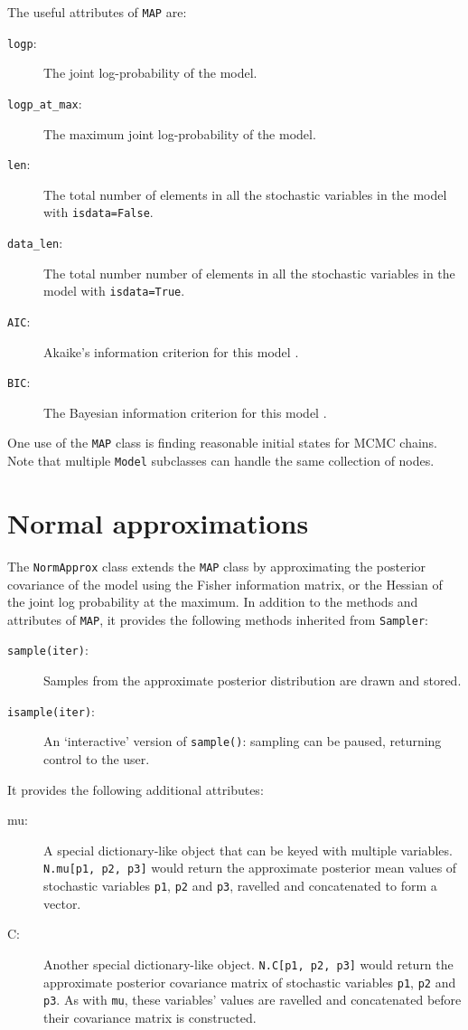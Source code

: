 The useful attributes of \texttt{MAP} are:
\begin{description}
    \item[\texttt{logp}:] The joint log-probability of the model.
    \item[\texttt{logp_at_max}:] The maximum joint log-probability of the model.
    \item[\texttt{len}:] The total number of elements in all the stochastic variables in the model with \texttt{isdata=False}.
    \item[\texttt{data_len}:] The total number number of elements in all the stochastic variables in the model with \texttt{isdata=True}.
    \item[\texttt{AIC}:] Akaike's information criterion for this model \cite{Akaike:1973aj,Burnham:2002ic}.
    \item[\texttt{BIC}:] The Bayesian information criterion for this model \cite{Schwarz:1978ud}.
\end{description}

One use of the \texttt{MAP} class is finding reasonable initial states for MCMC chains. Note that multiple \texttt{Model} subclasses can handle the same collection of nodes.

\hypertarget{norm-approx}{}
\section*{Normal approximations} \label{sec:norm-approx}

The \texttt{NormApprox} class extends the \texttt{MAP} class by approximating the posterior covariance of the model using the Fisher information matrix, or the Hessian of the joint log probability at the maximum. In addition to the methods and attributes of \texttt{MAP}, it provides the following methods inherited from \texttt{Sampler}:
\begin{description}
    \item[\texttt{sample(iter)}:] Samples from the approximate posterior distribution are drawn and stored.
    \item[\texttt{isample(iter)}:] An `interactive' version of \texttt{sample()}: sampling can be paused, returning control to the user.
\end{description}
It provides the following additional attributes:
\begin{description}
    \item[mu:] A special dictionary-like object that can be keyed with multiple variables. \texttt{N.mu[p1, p2, p3]} would return the approximate posterior mean values of stochastic variables \texttt{p1}, \texttt{p2} and \texttt{p3}, ravelled and concatenated to form a vector.
    \item[C:] Another special dictionary-like object. \texttt{N.C[p1, p2, p3]} would return the approximate posterior covariance matrix of stochastic variables \texttt{p1}, \texttt{p2} and \texttt{p3}. As with \texttt{mu}, these variables' values are ravelled and concatenated before their covariance matrix is constructed.
\end{description}

